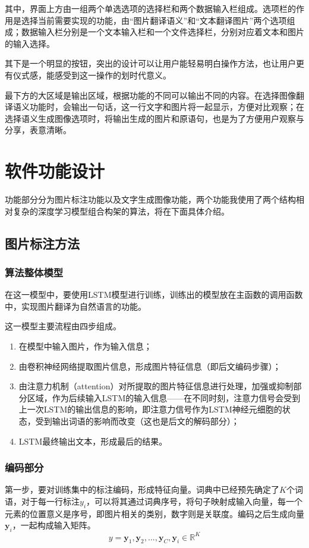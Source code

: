   其中，界面上方由一组两个单选选项的选择栏和两个数据输入栏组成。选项栏的作用是选择当前需要实现的功能，由“图片翻译语义”和“文本翻译图片”两个选项组成；数据输入栏分别是一个文本输入栏和一个文件选择栏，分别对应着文本和图片的输入选择。

  其下是一个明显的按钮，突出的设计可以让用户能轻易明白操作方法，也让用户更有仪式感，能感受到这一操作的划时代意义。

  最下方的大区域是输出区域，根据功能的不同可以输出不同的内容。在选择图像翻译语义功能时，会输出一句话，这一行文字和图片将一起显示，方便对比观察；在选择语义生成图像选项时，将输出生成的图片和原语句，也是为了方便用户观察与分享，表意清晰。

\section{软件功能设计}
功能部分分为图片标注功能以及文字生成图像功能，两个功能我使用了两个结构相对复杂的深度学习模型组合构架的算法，将在下面具体介绍。
 
\subsection{图片标注方法}
\subsubsection{算法整体模型}
在这一模型中，要使用LSTM模型进行训练，训练出的模型放在主函数的调用函数中，实现图片翻译为自然语言的功能。

这一模型主要流程由四步组成。

\begin{enumerate}[fullwidth,itemindent=2em,label=\arabic*.]
    \item 在模型中输入图片，作为输入信息；
    \item 由卷积神经网络提取图片信息，形成图片特征信息（即后文编码步骤）；
    \item 由注意力机制（attention）对所提取的图片特征信息进行处理，加强或抑制部分区域，作为后续输入LSTM的输入信息——在不同时刻，注意力信号会受到上一次LSTM的输出信息的影响，即注意力信号作为LSTM神经元细胞的状态，受到输出词语的影响而改变（这也是后文的解码部分）；
    \item LSTM最终输出文本，形成最后的结果。
\end{enumerate}

\subsubsection{编码部分}
第一步，要对训练集中的标注编码，形成特征向量。词典中已经预先确定了$K$个词语，对于每一行标注$y_i$，可以将其通过词典序号，将句子映射成输入向量，每一个元素的位置意义是序号，即图片相关的类别，数字则是关联度。编码之后生成向量$\textbf{y}_i$，一起构成输入矩阵。
$$y = {\textbf{y}_1, \textbf{y}_2, ..., \textbf{y}_C}, \textbf{y}_i\in \mathbb{R}^K$$

